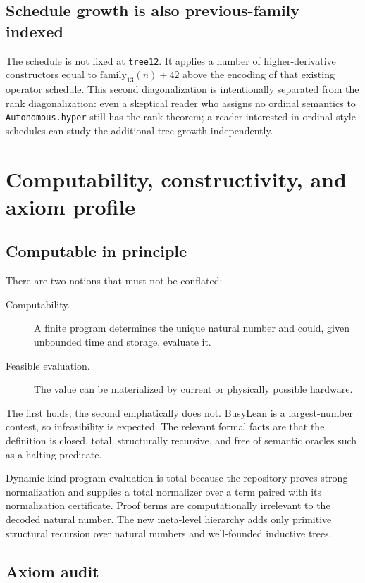\documentclass[11pt]{article}
\theoremstyle{definition}
\newcommand{\code}[1]{\texttt{#1}}
\begin{document}
\subsection{Schedule growth is also previous-family indexed}

The schedule is not fixed at \code{tree12}.  It applies a number of higher-derivative constructors equal to $\mathrm{family}_{13}(n)+42$ above the encoding of that existing operator schedule.  This second diagonalization is intentionally separated from the rank diagonalization: even a skeptical reader who assigns no ordinal semantics to \code{Autonomous.hyper} still has the rank theorem; a reader interested in ordinal-style schedules can study the additional tree growth independently.

\section{Computability, constructivity, and axiom profile}

\subsection{Computable in principle}

There are two notions that must not be conflated:
\begin{description}
\item[Computability.] A finite program determines the unique natural number and could, given unbounded time and storage, evaluate it.
\item[Feasible evaluation.] The value can be materialized by current or physically possible hardware.
\end{description}
The first holds; the second emphatically does not.  BusyLean is a largest-number contest, so infeasibility is expected.  The relevant formal facts are that the definition is closed, total, structurally recursive, and free of semantic oracles such as a halting predicate.

Dynamic-kind program evaluation is total because the repository proves strong normalization and supplies a total normalizer over a term paired with its normalization certificate.  Proof terms are computationally irrelevant to the decoded natural number.  The new meta-level hierarchy adds only primitive structural recursion over natural numbers and well-founded inductive trees.

\subsection{Axiom audit}
\end{document}
